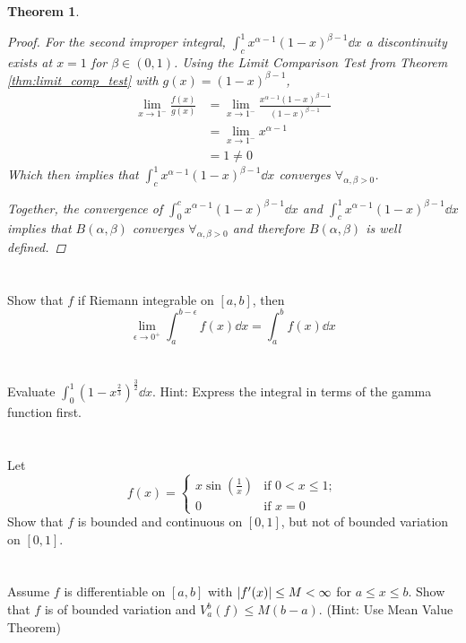\documentclass[]{article}
\newtheorem{theorem}{Theorem}
\begin{document}
\begin{theorem}
\begin{proof}
        For the second improper integral, $\int_{c}^{1} x^{\alpha-1} (1-x)^{\beta-1} \dd{x}$
        a discontinuity exists at $x = 1$ for $\beta \in (0,1)$. 
        Using the Limit Comparison Test from Theorem \ref{thm:limit_comp_test} with $g(x) = (1-x)^{\beta - 1}$, 
        \begin{align*}
            \lim_{x\to 1^{-}} \frac{f(x)}{g(x)} 
                &= \lim_{x\to 1^{-}} \frac{x^{\alpha-1} (1-x)^{\beta-1}}{(1-x)^{\beta - 1}}\\
                &= \lim_{x\to 1^{-}} x^{\alpha - 1}\\
                &= 1 \neq 0
        \end{align*}
        Which then implies that $\int_{c}^{1} x^{\alpha-1} (1-x)^{\beta-1} \dd{x}$ 
        converges $\forall_{\alpha,\beta > 0}$.

        Together, the convergence of $\int_{0}^{c} x^{\alpha-1} (1-x)^{\beta-1} \dd{x}$ 
        and $\int_{c}^{1} x^{\alpha-1} (1-x)^{\beta-1} \dd{x}$ 
        implies that $B(\alpha,\beta)$ converges $\forall_{\alpha,\beta>0}$ and therefore $B(\alpha,\beta)$ is well defined.
    \end{proof}
\end{theorem}



\newpage
\section{}
Show that $f$ if Riemann integrable on $[a,b]$, then \[
    \lim_{\epsilon\to 0^{+}} \int_{a}^{b - \epsilon} f(x) \dd{x} = \int_{a}^{b} f(x) \dd{x}
\]









\newpage
\section{}
Evaluate $\int_0^1 (1-x^{\frac{2}{3}})^{\frac{3}{2}} \dd{x}$.
Hint: Express the integral in terms of the gamma function first.





\newpage
\section{}
Let \[
    f(x) = \begin{cases}
        x \sin(\frac{1}{x}) &\text{if } 0<x \leq 1;\\
        0 &\text{if } x = 0
    \end{cases}
\] Show that $f$ is bounded and continuous on $[0,1]$, but not of bounded variation on $[0,1]$.





\newpage
\section{}
Assume $f$ is differentiable on $[a,b]$ with $\abs{f'(x)} \leq M < \infty$ for $a\leq x\leq b$.
Show that $f$ is of bounded variation and $V_a^b (f) \leq M(b-a)$.
(Hint: Use Mean Value Theorem)
\end{document}
